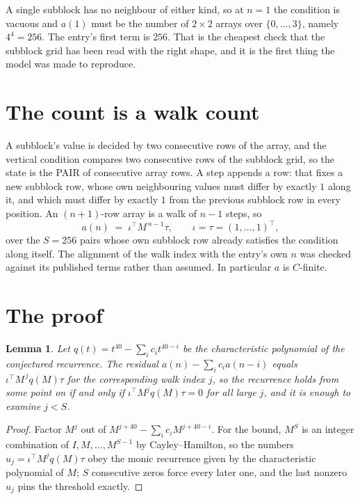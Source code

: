 \documentclass[11pt,a4paper]{article}
\theoremstyle{plain}
\newtheorem{lemma}[theorem]{Lemma}
\theoremstyle{definition}
\begin{document}
A single subblock has no neighbour of either kind, so at $n=1$ the condition is vacuous and
$a(1)$ must be the number of $2\times2$ arrays over $\{0,\dots,3\}$, namely
$4^{4}=256$. The entry's first term is $256$.
That is the cheapest check that the subblock grid has been read with the right shape, and it
is the first thing the model was made to reproduce.

\section{The count is a walk count}

A subblock's value is decided by two consecutive rows of the array, and the
vertical condition compares two consecutive rows of the subblock grid, so the state is the
PAIR of consecutive array rows. A step appends a row: that fixes a new subblock row, whose own
neighbouring values must differ by exactly $1$ along it, and which must differ by exactly
$1$ from the previous subblock row in every position. An $(n+1)$-row array is a walk of
$n-1$ steps, so
\[
a(n)\;=\;\iota^{\!\top}M^{\,n-1}\tau,\qquad\iota=\tau=(1,\dots,1)^{\!\top},
\]
over the $S=256$ pairs whose own subblock row already satisfies the condition along itself.
The alignment of the walk index with the entry's own $n$ was checked against its published
terms rather than assumed. In particular $a$ is $C$-finite.

\section{The proof}

\begin{lemma}\label{lem:crit}
Let $q(t)=t^{40}-\sum_i c_it^{40-i}$ be the characteristic polynomial of the
conjectured recurrence. The residual $a(n)-\sum_ic_ia(n-i)$ equals
$\iota^{\!\top}M^{\,j}q(M)\tau$ for the corresponding walk index $j$, so the recurrence
holds from some point on if and only if $\iota^{\!\top}M^{j}q(M)\tau=0$ for all large $j$,
and it is enough to examine $j<S$.
\end{lemma}

\begin{proof}
Factor $M^{j}$ out of $M^{j+40}-\sum_ic_iM^{j+40-i}$. For the bound, $M^{S}$
is an integer combination of $I,M,\dots,M^{S-1}$ by Cayley--Hamilton, so the numbers
$u_j=\iota^{\!\top}M^{j}q(M)\tau$ obey the monic recurrence given by the characteristic
polynomial of $M$; $S$ consecutive zeros force every later one, and the last nonzero $u_j$
pins the threshold exactly.
\end{proof}
\end{document}
